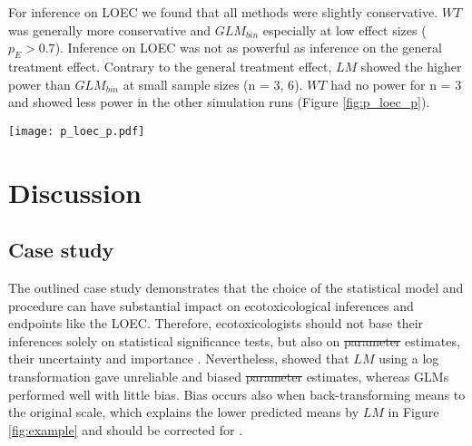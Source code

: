 \documentclass[twocolumn, natbib]{svjour3}
\providecommand{\DIFadd}[1]{{\protect\color{blue}\uwave{#1}}} %
\providecommand{\DIFdel}[1]{{\protect\color{red}\sout{#1}}}                      %
\providecommand{\DIFaddbegin}{} %
\providecommand{\DIFaddend}{} %
\providecommand{\DIFdelbegin}{} %
\providecommand{\DIFdelend}{} %
\providecommand{\DIFaddFL}[1]{\DIFadd{#1}} %
\providecommand{\DIFdelFL}[1]{\DIFdel{#1}} %
\providecommand{\DIFaddbeginFL}{} %
\providecommand{\DIFaddendFL}{} %
\providecommand{\DIFdelbeginFL}{} %
\providecommand{\DIFdelendFL}{} %
\begin{document}
For inference on LOEC we found that all methods were slightly conservative.
$WT$ was generally more conservative and $GLM_{bin}$ especially at low effect sizes ($p_E > 0.7$).
Inference on LOEC was not as powerful as inference on the general treatment effect.
Contrary to the general treatment effect, $LM$ showed the higher power than $GLM_{bin}$ at small sample sizes (n = {3, 6}).
$WT$ had no power for n = 3 and showed less power in the other simulation runs (Figure \ref{fig:p_loec_p}).

\begin{figure*}
  \centering
  \texttt{[image: p\_loec\_p.pdf]}
  \caption{
  Binomial data simulations: 
  Type \DIFdelbeginFL \DIFdelFL{1 }\DIFdelendFL \DIFaddbeginFL \DIFaddFL{I }\DIFaddendFL error (top) and power (bottom) for the test for determination of LOEC. 
  Dashed horizontal line denotes the nominal Type \DIFdelbeginFL \DIFdelFL{1 }\DIFdelendFL \DIFaddbeginFL \DIFaddFL{I }\DIFaddendFL error rate at $\alpha = 0.05$.
  }
  \label{fig:p_loec_p}
\end{figure*}


\section{Discussion}
\label{sec:disc}
\subsection{Case study}
The outlined case study demonstrates that the choice of the statistical model and procedure can have substantial impact on ecotoxicological inferences and endpoints like the LOEC.
Therefore, ecotoxicologists should not base their inferences solely on statistical significance tests, but also on \DIFdelbegin \DIFdel{parameter }\DIFdelend \DIFaddbegin \DIFadd{model }\DIFaddend estimates, their uncertainty and importance \citep{gelman_difference_2006}.
Nevertheless, \citet{ohara_not_2010} showed that $LM$ using a log transformation gave unreliable and biased \DIFdelbegin \DIFdel{parameter }\DIFdelend estimates, whereas GLMs performed well with little bias.
Bias occurs also when back-transforming means to the original scale, which explains the lower predicted means by $LM$ in Figure \ref{fig:example} \citep{rothery_cautionary_1988} and should be corrected for \citep{newman_regression_1993}.
\end{document}
